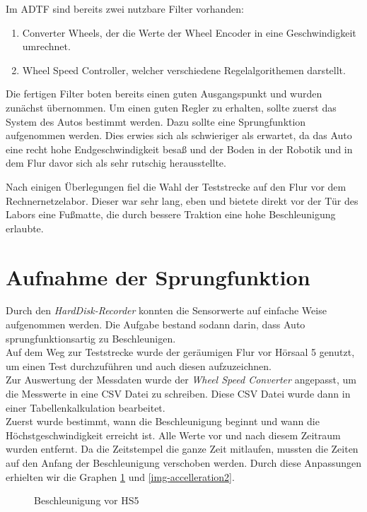 \documentclass[a4paper,12pt]{report}
\begin{document}
	Im ADTF sind bereits zwei nutzbare Filter vorhanden:
	\begin{enumerate}[label=]
		\item Converter Wheels, der die Werte der Wheel Encoder in eine Geschwindigkeit umrechnet.
		\item Wheel Speed Controller, welcher verschiedene Regelalgorithemen darstellt.
	\end{enumerate}
	Die fertigen Filter boten bereits einen guten Ausgangspunkt und wurden zunächst übernommen.
	Um einen guten Regler zu erhalten, sollte zuerst das System des Autos bestimmt werden.
	Dazu sollte eine Sprungfunktion aufgenommen werden.
	Dies erwies sich als schwieriger als erwartet, da das Auto eine recht hohe Endgeschwindigkeit besaß und der Boden in der Robotik und in dem Flur davor sich als sehr rutschig herausstellte.

	Nach einigen Überlegungen fiel die Wahl der Teststrecke auf den Flur vor dem Rechnernetzelabor.
	Dieser war sehr lang, eben und bietete direkt vor der Tür des Labors eine Fußmatte, die durch bessere Traktion eine hohe Beschleunigung erlaubte.

\section{Aufnahme der Sprungfunktion}
	Durch den \emph{HardDisk-Recorder} konnten die Sensorwerte auf einfache Weise aufgenommen werden.
	Die Aufgabe bestand sodann darin, dass Auto sprungfunktionsartig zu Beschleunigen.
	\\
	Auf dem Weg zur Teststrecke wurde der geräumigen Flur vor Hörsaal 5 genutzt, um einen Test durchzuführen und auch diesen aufzuzeichnen.
	\\
	Zur Auswertung der Messdaten wurde der \emph{Wheel Speed Converter} angepasst, um die Messwerte in eine CSV Datei zu schreiben.
	Diese CSV Datei wurde dann in einer Tabellenkalkulation bearbeitet.
	\\
	Zuerst wurde bestimmt, wann die Beschleunigung beginnt und wann die Höchstgeschwindigkeit erreicht ist.
	Alle Werte vor und nach diesem Zeitraum wurden entfernt.
	Da die Zeitstempel die ganze Zeit mitlaufen, mussten die Zeiten auf den Anfang der Beschleunigung verschoben werden.
	Durch diese Anpassungen erhielten wir die Graphen \ref{img-accelleration1} und \ref{img-accelleration2}.
	\begin{figure}[ht]
		\centering

		\caption{Beschleunigung vor HS5}
		\label{img-accelleration1}
	\end{figure}
\end{document}
